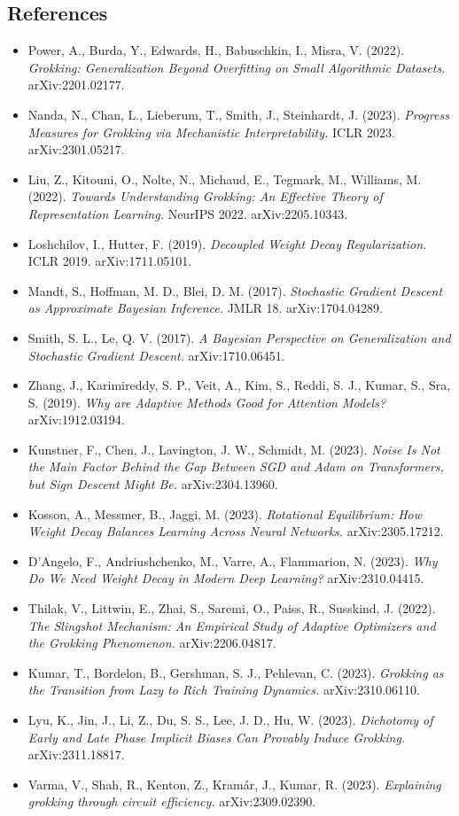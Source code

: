 \documentclass[
  11pt,
]{article}
\providecommand{\tightlist}{%
  \setlength{\itemsep}{0pt}\setlength{\parskip}{0pt}}
\begin{document}
\subsection{References}\label{references}

\begin{itemize}
\tightlist
\item
  Power, A., Burda, Y., Edwards, H., Babuschkin, I., Misra, V. (2022).
  \emph{Grokking: Generalization Beyond Overfitting on Small Algorithmic
  Datasets.} arXiv:2201.02177.
\item
  Nanda, N., Chan, L., Lieberum, T., Smith, J., Steinhardt, J. (2023).
  \emph{Progress Measures for Grokking via Mechanistic
  Interpretability.} ICLR 2023. arXiv:2301.05217.
\item
  Liu, Z., Kitouni, O., Nolte, N., Michaud, E., Tegmark, M., Williams,
  M. (2022). \emph{Towards Understanding Grokking: An Effective Theory
  of Representation Learning.} NeurIPS 2022. arXiv:2205.10343.
\item
  Loshchilov, I., Hutter, F. (2019). \emph{Decoupled Weight Decay
  Regularization.} ICLR 2019. arXiv:1711.05101.
\item
  Mandt, S., Hoffman, M. D., Blei, D. M. (2017). \emph{Stochastic
  Gradient Descent as Approximate Bayesian Inference.} JMLR 18.
  arXiv:1704.04289.
\item
  Smith, S. L., Le, Q. V. (2017). \emph{A Bayesian Perspective on
  Generalization and Stochastic Gradient Descent.} arXiv:1710.06451.
\item
  Zhang, J., Karimireddy, S. P., Veit, A., Kim, S., Reddi, S. J., Kumar,
  S., Sra, S. (2019). \emph{Why are Adaptive Methods Good for Attention
  Models?} arXiv:1912.03194.
\item
  Kunstner, F., Chen, J., Lavington, J. W., Schmidt, M. (2023).
  \emph{Noise Is Not the Main Factor Behind the Gap Between SGD and Adam
  on Transformers, but Sign Descent Might Be.} arXiv:2304.13960.
\item
  Kosson, A., Messmer, B., Jaggi, M. (2023). \emph{Rotational
  Equilibrium: How Weight Decay Balances Learning Across Neural
  Networks.} arXiv:2305.17212.
\item
  D'Angelo, F., Andriushchenko, M., Varre, A., Flammarion, N. (2023).
  \emph{Why Do We Need Weight Decay in Modern Deep Learning?}
  arXiv:2310.04415.
\item
  Thilak, V., Littwin, E., Zhai, S., Saremi, O., Paiss, R., Susskind, J.
  (2022). \emph{The Slingshot Mechanism: An Empirical Study of Adaptive
  Optimizers and the Grokking Phenomenon.} arXiv:2206.04817.
\item
  Kumar, T., Bordelon, B., Gershman, S. J., Pehlevan, C. (2023).
  \emph{Grokking as the Transition from Lazy to Rich Training Dynamics.}
  arXiv:2310.06110.
\item
  Lyu, K., Jin, J., Li, Z., Du, S. S., Lee, J. D., Hu, W. (2023).
  \emph{Dichotomy of Early and Late Phase Implicit Biases Can Provably
  Induce Grokking.} arXiv:2311.18817.
\item
  Varma, V., Shah, R., Kenton, Z., Kramár, J., Kumar, R. (2023).
  \emph{Explaining grokking through circuit efficiency.}
  arXiv:2309.02390.
\end{itemize}
\end{document}
